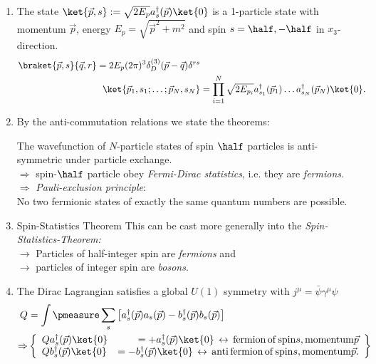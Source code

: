 \begin{enumerate}
	\item The state $\ket{\vec{p},s} :=\sqrt{2E_p}a^{\dagger}_s(\vec{p})\ket{0}$ is a 1-particle state with momentum $ \vec{p}$, energy $E_p=\sqrt{\vec{p}^2+m^2}$ and spin $s=\half,-\half$ in $x_3$-direction.
	\begin{align}
		\braket{\vec{p},s}{\vec{q},r} = 2 E_p (2 \pi)^3 \delta^{(3)}_D(\vec{p}-\vec{q}) \delta^{rs} \\
		\ket{\vec{p}_1,s_1;\dots;\vec{p}_N,s_N} &= \prod_{i=1}^{N} \sqrt{2 E_{p_i}} a^{\dagger}_{s_1} (\vec{p}_1) \dots a^{\dagger}_{s_N} (\vec{p}_N) \ket{0}.
	\end{align}
\item By the anti-commutation relations we state the theorems:
\begin{statements}
	The wavefunction of $N$-particle states of spin $\half$ particles is anti-symmetric under particle exchange.\\
	$\Rightarrow$ spin-$\half$ particle obey \emph{Fermi-Dirac statistics}, i.e. they are \emph{fermions}.\\
	$\Rightarrow$ \emph{Pauli-exclusion principle}:\\
	No two fermionic states of exactly the same quantum numbers are possible.
\end{statements}
\item \begin{mybox}{Spin-Statistics Theorem}
	This can be cast more generally into the \emph{Spin-Statistics-Theorem:}\\
	$\rightarrow$ Particles of half-integer spin are \emph{fermions} and \\
	$\rightarrow$ particles of integer spin are \emph{bosons}.
\end{mybox}
\item The Dirac Lagrangian satisfies a global $U(1)$ symmetry with $j^{\mu} =\bar{\psi} \gamma^{\mu} \psi$\\
\begin{align}
	Q&= \int \pmeasure \sum_s \left[a^{\dagger}_s(\vec{p})a_s(\vec{p})  -b^{\dagger}_s(\vec{p}) b_s(\vec{p}) \right]\\
	\Rightarrow & \left\{		\begin{array}{lr}
		Qa^{\dagger}_s(\vec{p}) \ket{0} &=+a^{\dagger}_s(\vec{p}) \ket{0} \, \leftrightarrow\, \mathrm{fermion\, of \, spin} s, \mathrm{momentum} \vec{p} \\
		Q b^{\dagger}_s(\vec{p}) \ket{0} &=-b^{\dagger}_s(\vec{p}) \ket{0} \, \leftrightarrow \, \mathrm{anti \, fermion \, of \, spin} s, \mathrm{momentum} \vec{p}.
	\end{array}		\right\}
\end{align}

\end{enumerate}

